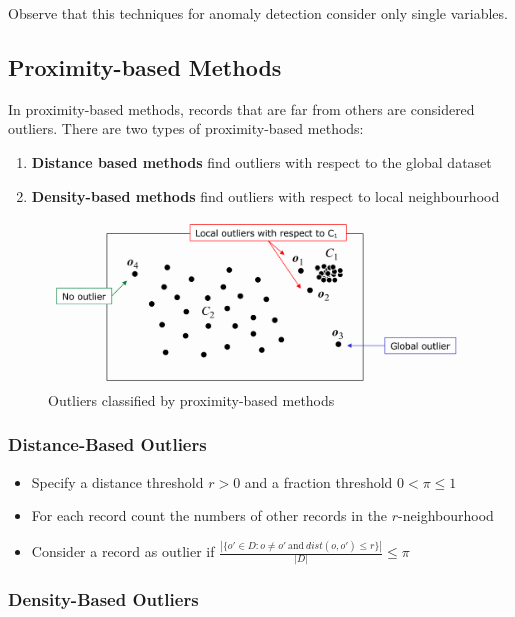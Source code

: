 \documentclass[11pt]{article}
\begin{document}
Observe that this techniques for anomaly detection consider only single variables.

\subsection{Proximity-based Methods}

In proximity-based methods, records that are far from others are considered outliers. There are two types of proximity-based methods:
\begin{enumerate}
    \item \textbf{Distance based methods} find outliers with respect to the global dataset
    \item \textbf{Density-based methods} find outliers with respect to local neighbourhood
\end{enumerate}

\begin{figure}[tbh!]
    \centering
    \includegraphics[width=0.6\linewidth, keepaspectratio]{Pictures/outlier_proximity-based}
    \caption{Outliers classified by proximity-based methods}
    \label{fig:outlierproximity-based}
\end{figure}

\subsubsection{Distance-Based Outliers}

\begin{itemize}
    \item Specify a distance threshold $r>0$ and a fraction threshold $0<\pi\leq 1$
    \item For each record count the numbers of other records in the $r$-neighbourhood
    \item Consider a record as outlier if $\frac{|\{o'\in D: o \neq o'\ \text{and}\ dist(o,o')\leq r \}|}{|D|} \leq\pi$
\end{itemize}

\subsubsection{Density-Based Outliers}
\end{document}
